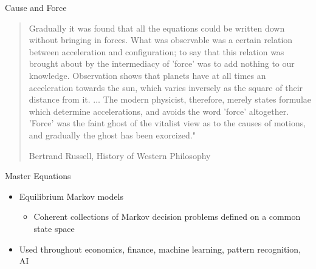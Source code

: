 \documentclass[aspectratio=169]{beamer}
\theoremstyle{Definition}
\begin{document}
\begin{frame}{Cause and Force}

\begin{quote}


 Gradually it was found that all the equations could be written down without bringing in forces. What was observable was a certain relation between acceleration and configuration; to say that this relation was brought about by the intermediacy of 'force' was to add nothing to our knowledge. Observation shows that planets have at all times an acceleration towards the sun, which varies inversely as the square of their distance from it. 
 $\ldots$ %
 The modern physicist, therefore, merely states formulae which determine accelerations, and avoids the word 'force' altogether. 'Force' was the faint ghost of the vitalist view as to the causes of motions, and gradually the ghost has been exorcized."
 
 \bigskip

\quad \quad Bertrand Russell, History of Western Philosophy


\end{quote}


\end{frame}







\begin{frame}{Master Equations}
\begin{itemize}
\item Equilibrium Markov models
\begin{itemize}
\item Coherent collections of Markov decision problems defined on a common state space
\end{itemize}
\item Used throughout  economics, finance, machine learning, pattern recognition, AI
\end{itemize}


\end{frame}
\end{document}
